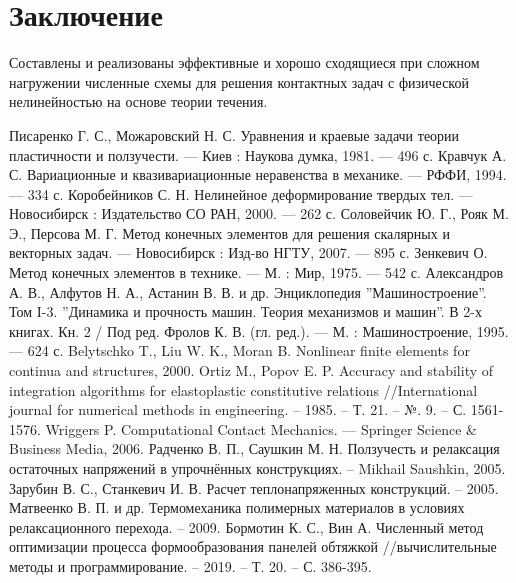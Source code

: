 \chapter{Заключение}
Составлены и реализованы эффективные и хорошо сходящиеся при сложном нагружении численные схемы для решения контактных задач с физической нелинейностью на основе теории течения.
\begin{thebibliography}{3}
	Писаренко Г. С., Можаровский Н. С. Уравнения и краевые задачи теории пластичности и ползучести. --- Киев : Наукова думка, 1981. --- 496 с.
	Кравчук А. С. Вариационные и квазивариационные неравенства в механике. --- РФФИ, 1994. --- 334 с.
	Коробейников С. Н. Нелинейное деформирование твердых тел. --- Новосибирск : Издательство СО РАН, 2000. --- 262 с.
	Соловейчик Ю. Г., Рояк М. Э., Персова М. Г. Метод конечных элементов для решения скалярных и векторных задач. --- Новосибирск : Изд-­во НГТУ, 2007. --- 895 с.
	Зенкевич О. Метод конечных элементов в технике. --- М. : Мир, 1975. --- 542 с.
	Александров А. В., Алфутов Н. А., Астанин В. В. и др. Энциклопедия ”Машиностроение”. Том I-­3. ”Динамика и прочность машин. Теория механизмов и машин”. В 2-­х книгах. Кн. 2 / Под ред. Фролов К. В. (гл. ред.). --- М. : Машиностроение, 1995. --- 624 с.
	Belytschko T., Liu W. K., Moran B. Nonlinear finite elements for continua and structures, 2000.
	Ortiz M., Popov E. P. Accuracy and stability of integration algorithms for elastoplastic constitutive relations //International journal for numerical methods in engineering. – 1985. – Т. 21. – №. 9. – С. 1561-1576.
	Wriggers P. Computational Contact Mechanics. --- Springer Science \& Business Media, 2006.
	Радченко В. П., Саушкин М. Н. Ползучесть и релаксация остаточных напряжений в упрочнённых конструкциях. – Mikhail Saushkin, 2005.
	Зарубин В. С., Станкевич И. В. Расчет теплонапряженных конструкций. – 2005.
	Матвеенко В. П. и др. Термомеханика полимерных материалов в условиях релаксационного перехода. – 2009.
	Бормотин К. С., Вин А. Численный метод оптимизации процесса формообразования панелей обтяжкой //вычислительные методы и программирование. – 2019. – Т. 20. – С. 386-395.
	
\end{thebibliography}





